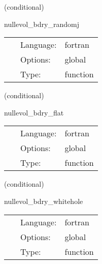 \vspace{5mm}

   (conditional) 

\hspace{5mm} nullevol\_bdry\_randomj 

\hspace{5mm}{\it give random j boundary conditions for the null metric } 


\hspace{5mm}

 \begin{tabular*}{160mm}{cll} 
~ & Language:  & fortran \\ 
~ & Options:  & global \\ 
~ & Type:  & function \\ 
\end{tabular*} 


\vspace{5mm}

   (conditional) 

\hspace{5mm} nullevol\_bdry\_flat 

\hspace{5mm}{\it give flat boundary conditions for the null metric } 


\hspace{5mm}

 \begin{tabular*}{160mm}{cll} 
~ & Language:  & fortran \\ 
~ & Options:  & global \\ 
~ & Type:  & function \\ 
\end{tabular*} 


\vspace{5mm}

   (conditional) 

\hspace{5mm} nullevol\_bdry\_whitehole 

\hspace{5mm}{\it give white hole boundary conditions for the null metric } 


\hspace{5mm}

 \begin{tabular*}{160mm}{cll} 
~ & Language:  & fortran \\ 
~ & Options:  & global \\ 
~ & Type:  & function \\ 
\end{tabular*} 


